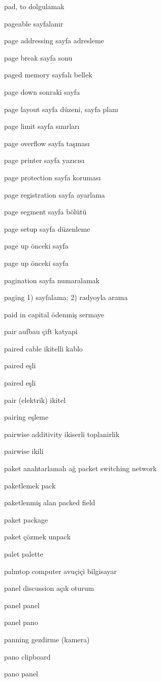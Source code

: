 \documentclass[12pt,fleqn]{article}\usepackage{../../common}
\begin{document}
pad, to dolgulamak

pageable sayfalanır

page addressing sayfa adresleme

page break sayfa sonu

paged memory sayfalı bellek

page down sonraki sayfa

page layout sayfa düzeni, sayfa planı

page limit sayfa sınırları

page overflow sayfa taşması

page printer sayfa yazıcısı

page protection sayfa koruması

page registration sayfa ayarlama

page segment sayfa bölütü

page setup sayfa düzenleme

page up önceki sayfa

page up önceki sayfa

pagination sayfa numaralamak

paging 1) sayfalama; 2) radyoyla arama

paid in capital ödenmiş sermaye

pair aufbau çift katyapi

paired cable ikitelli kablo

paired eşli

paired eşli

pair (elektrik) ikitel

pairing eşleme

pairwise additivity ikiserli toplanirlik

pairwise ikili

paket anahtarlamalı ağ packet switching network

paketlemek pack

paketlenmiş alan packed field

paket package

paket çözmek unpack

palet palette

palmtop computer avuçiçi bilgisayar

panel discussion açık oturum

panel panel

panel pano

panning gezdirme (kamera)

pano clipboard

pano panel
\end{document}
